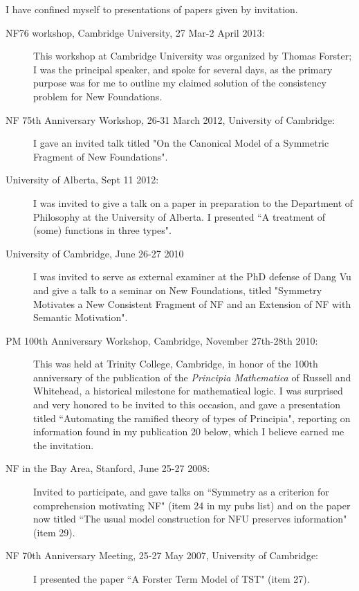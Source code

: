 \begin{description}
I have confined myself to presentations of papers given by invitation.

\begin{description}
\item[NF76 workshop, Cambridge University, 27 Mar-2 April 2013:]  This workshop at Cambridge University was organized by Thomas Forster; I was the principal speaker, and spoke for several days, as the primary purpose was for me to outline my claimed solution of the consistency problem for New Foundations.

\item[NF 75th Anniversary Workshop, 26-31 March 2012, University of Cambridge:]  I gave an invited talk titled "On the Canonical Model of a Symmetric Fragment of New Foundations". 

\item[University of Alberta, Sept 11 2012:]  I was invited to give a talk on a paper in preparation to the Department of Philosophy at the University of Alberta.   I presented ``A treatment of (some) functions in three types".

\item[University of Cambridge, June 26-27 2010]  I was invited to serve as external examiner at the  PhD defense of Dang Vu and give a talk to a seminar on New Foundations, titled "Symmetry Motivates a New Consistent Fragment of NF and an Extension of NF with Semantic Motivation".

\item[PM 100th Anniversary Workshop, Cambridge, November 27th-28th 2010:]   This was held at Trinity College, Cambridge, in honor of the 100th anniversary of the publication of the {\em Principia Mathematica\/} of Russell and Whitehead, a historical milestone for mathematical logic. I was surprised and very honored to be invited to this occasion, and gave a
presentation titled  ``Automating the ramified theory of types of Principia", reporting on information found in my publication 20 below, which I believe earned me the invitation.

\item[NF in the Bay Area, Stanford, June 25-27 2008:]  Invited to participate, and gave talks on  ``Symmetry as a criterion for comprehension motivating NF" (item 24 in my pubs list)  and on the paper now titled ``The usual model construction for NFU preserves information" (item 29).

\item[NF 70th Anniversary Meeting, 25-27 May 2007, University of Cambridge:]  I presented the paper ``A Forster Term Model of TST" (item 27).


\end{description}
\end{description}
